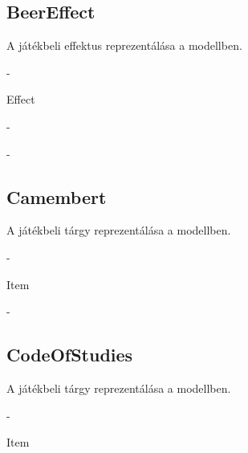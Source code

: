 \subsection{BeerEffect}
\begin{class-template-responsibility}
    A játékbeli effektus reprezentálása a modellben.
\end{class-template-responsibility}
\begin{class-template-interface}
    -
\end{class-template-interface}
\begin{class-template-baseclass}
    Effect
\end{class-template-baseclass}
\begin{class-template-attribute}
    -
\end{class-template-attribute}
\begin{class-template-method}
    -
\end{class-template-method}

\subsection{Camembert}
\begin{class-template-responsibility}
    A játékbeli tárgy reprezentálása a modellben.
\end{class-template-responsibility}
\begin{class-template-interface}
    -
\end{class-template-interface}
\begin{class-template-baseclass}
    Item
\end{class-template-baseclass}
\begin{class-template-attribute}
    -
\end{class-template-attribute}
\begin{class-template-method}
\end{class-template-method}

\subsection{CodeOfStudies}
\begin{class-template-responsibility}
    A játékbeli tárgy reprezentálása a modellben.
\end{class-template-responsibility}
\begin{class-template-interface}
    -
\end{class-template-interface}
\begin{class-template-baseclass}
    Item
\end{class-template-baseclass}
\begin{class-template-attribute}
\end{class-template-attribute}
\begin{class-template-method}
\end{class-template-method}

